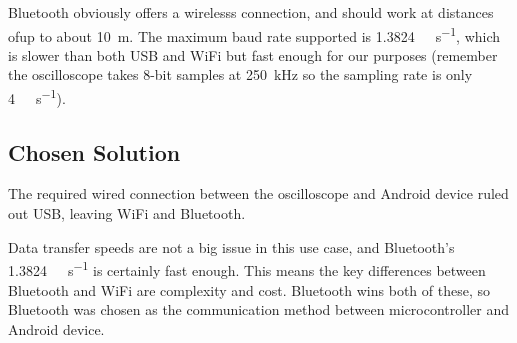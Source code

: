 Bluetooth obviously offers a wirelesss connection, and should work at distances
ofup to about \SI{10}{\m}. The maximum baud rate supported is
\SI{1.3824}{\mega\bit\per\second}, which is slower than both USB and WiFi but
fast enough for our purposes (remember the oscilloscope takes 8-bit samples at
\SI{250}{\kHz} so the sampling rate is only \SI{4}{\mega\bit\per\second}).

\subsection*{Chosen Solution}
The required wired connection between the oscilloscope and Android device ruled
out USB, leaving WiFi and Bluetooth.

Data transfer speeds are not a big issue in this use case, and Bluetooth's
\SI{1.3824}{\mega\bit\per\second} is certainly fast enough. This means the key
differences between Bluetooth and WiFi are complexity and cost. Bluetooth wins
both of these, so Bluetooth was chosen as the communication method between
microcontroller and Android device.
